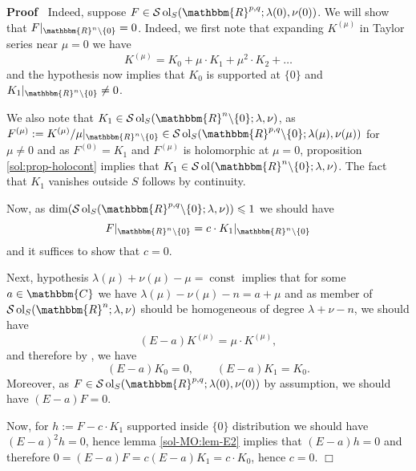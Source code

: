\documentclass{article}
\newcommand{\assign}{:=}
\newcommand{\tmop}[1]{\ensuremath{\operatorname{#1}}}
\newenvironment{proof}{\noindent\textbf{Proof\ }}{\hspace*{\fill}$\Box$\medskip}
\numberwithin{definition}{section}
\numberwithin{lemma}{section}
\numberwithin{proposition}{section}
{\theorembodyfont{\rmfamily}\newtheorem{remark}{Remark}
\numberwithin{remark}{section}
}
\begin{document}
\begin{proof}
  Indeed, suppose $F \in \mathcal{S} \tmop{ol}_S ( \mathbbm{R}^{p, q} ;
  \lambda ( 0), \nu ( 0))$. We will show that $F |_{\mathbbm{R}^n \backslash
  \{ 0 \}} = 0$. Indeed, we first note that expanding $K_{}^{( \mu)}$ in
  Taylor series near $\mu = 0$ we have
  \[ K_{}^{( \mu)} = K_0 + \mu \cdot K_1 + \mu^2 \cdot K_2 + \ldots \]
  and the hypothesis now implies that $K_0$ is supported at $\{ 0 \}$ and $K_1
  |_{\mathbbm{R}^n \backslash \{ 0 \}} \neq 0$.
  
  We also note that $K_1 \in \mathcal{S} \tmop{ol}_S ( \mathbbm{R}^n
  \backslash \{ 0 \} ; \lambda, \nu)$, as $F^{( \mu)} \assign K^{( \mu)} / \mu
  |_{\mathbbm{R}^n \backslash \{ 0 \}} \in \mathcal{S} \tmop{ol}_S (
  \mathbbm{R}^{p, q} \backslash \{ 0 \} ; \lambda ( \mu), \nu ( \mu))$ for
  $\mu \neq 0$ and as $F^{( 0)} = K_1$ and $F^{( \mu)}$ is holomorphic at $\mu
  = 0$, proposition \ref{sol:prop-holocont} implies that $K_1 \in \mathcal{S}
  \tmop{ol}_{} ( \mathbbm{R}^n \backslash \{ 0 \} ; \lambda, \nu)$. The fact
  that $K_1$ vanishes outside $S$ follows by continuity.
  
  Now, as $\dim ( \mathcal{S} \tmop{ol}_S ( \mathbbm{R}^{p, q} \backslash \{ 0
  \} ; \lambda, \nu)) \leqslant 1$ we should have
  \[ F |_{\mathbbm{R}^n \backslash \{ 0 \}} = c \cdot K_1 |_{\mathbbm{R}^n
     \backslash \{ 0 \}} \]
  and it suffices to show that $c = 0$.
  
  Next, hypothesis $\lambda ( \mu) + \nu ( \mu) - \mu = \tmop{const}$ implies
  that for some $a \in \mathbbm{C}$ we have $\lambda ( \mu) - \nu ( \mu) - n =
  a + \mu$ and as member of $\mathcal{S} \tmop{ol}_S ( \mathbbm{R}^n ;
  \lambda, \nu)$ should be homogeneous of degree $\lambda + \nu - n$, we
  should have
  \[ ( E - a) K^{( \mu)} = \mu \cdot K^{( \mu)}, \]
  and therefore by {\cite[lem. 11.10]{kobayashi2015symmetry}}, we have
  \[ ( E - a) K_0 = 0, \hspace{2em} ( E - a) K_1 = K_0 . \]
  Moreover, as $F \in \mathcal{S} \tmop{ol}_S ( \mathbbm{R}^{p, q} ; \lambda (
  0), \nu ( 0))$ by assumption, we should have $( E - a) F = 0$.
  
  Now, for $h \assign F - c \cdot K_1$ supported inside $\{ 0 \}$ distribution
  we should have $( E - a)^2 h = 0$, hence lemma \ref{sol-MO:lem-E2} implies
  that $( E - a) h = 0$ and therefore $0 = ( E - a) F = c ( E - a) K_1 = c
  \cdot K_0$, hence $c = 0$.
\end{proof}
\end{document}
